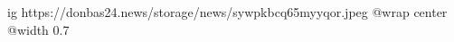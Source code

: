  
 
 
 
 

\ifcmt
  ig https://donbas24.news/storage/news/sywpkbcq65myyqor.jpeg
  @wrap center
  @width 0.7
\fi
